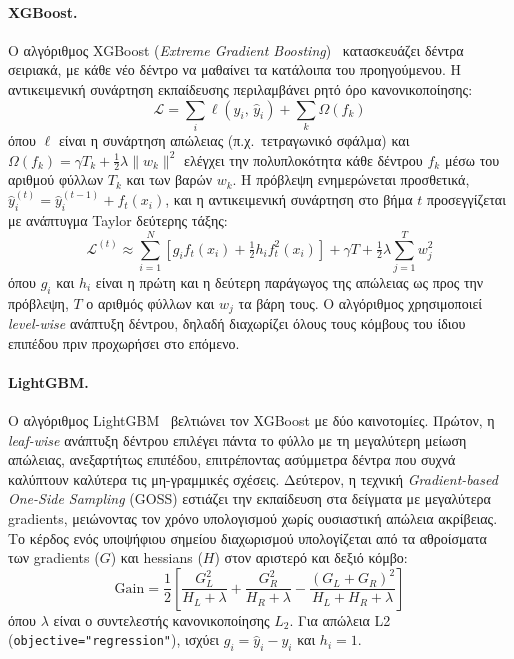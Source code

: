 \paragraph{XGBoost.}
Ο αλγόριθμος XGBoost (\textit{Extreme Gradient Boosting})~\cite{chen2016xgboost}
κατασκευάζει δέντρα σειριακά, με κάθε νέο δέντρο να
μαθαίνει τα κατάλοιπα του προηγούμενου. Η αντικειμενική
συνάρτηση εκπαίδευσης περιλαμβάνει ρητό όρο κανονικοποίησης:
%
\begin{equation}
  \mathcal{L} = \sum_{i} \ell\!\left(y_i,\,\hat{y}_i\right)
    + \sum_{k}\Omega(f_k)
  \label{eq:xgb}
\end{equation}
%
όπου $\ell$ είναι η συνάρτηση απώλειας (π.χ.\ τετραγωνικό σφάλμα)
και $\Omega(f_k) = \gamma T_k + \frac{1}{2}\lambda\|w_k\|^2$
ελέγχει την πολυπλοκότητα κάθε δέντρου $f_k$ μέσω
του αριθμού φύλλων $T_k$ και των βαρών $w_k$.
Η πρόβλεψη ενημερώνεται προσθετικά,
$\hat{y}_i^{(t)} = \hat{y}_i^{(t-1)} + f_t(x_i)$, και η αντικειμενική συνάρτηση
στο βήμα $t$ προσεγγίζεται με ανάπτυγμα Taylor δεύτερης τάξης:
%
\begin{equation}
  \mathcal{L}^{(t)} \approx \sum_{i=1}^{N}\left[g_i f_t(x_i)
     + \tfrac{1}{2}h_i f_t^2(x_i)\right]
     + \gamma T + \tfrac{1}{2}\lambda\sum_{j=1}^{T} w_j^2
  \label{eq:xgb_taylor}
\end{equation}
%
όπου $g_i$ και $h_i$ είναι η πρώτη και η δεύτερη παράγωγος της απώλειας ως προς
την πρόβλεψη, $T$ ο αριθμός φύλλων και $w_j$ τα βάρη τους.
Ο αλγόριθμος χρησιμοποιεί \emph{level-wise} ανάπτυξη
δέντρου, δηλαδή διαχωρίζει όλους τους κόμβους του
ίδιου επιπέδου πριν προχωρήσει στο επόμενο.

\paragraph{LightGBM.}
Ο αλγόριθμος LightGBM~\cite{ke2017lgbm} βελτιώνει
τον XGBoost με δύο καινοτομίες. Πρώτον, η \emph{leaf-wise}
ανάπτυξη δέντρου επιλέγει πάντα το φύλλο με τη μεγαλύτερη
μείωση απώλειας, ανεξαρτήτως επιπέδου, επιτρέποντας
ασύμμετρα δέντρα που συχνά καλύπτουν καλύτερα τις μη-γραμμικές
σχέσεις. Δεύτερον, η τεχνική \textit{Gradient-based One-Side
Sampling} (GOSS) εστιάζει την εκπαίδευση στα δείγματα
με μεγαλύτερα gradients, μειώνοντας τον χρόνο υπολογισμού
χωρίς ουσιαστική απώλεια ακρίβειας.
Το κέρδος ενός υποψήφιου σημείου διαχωρισμού υπολογίζεται από τα αθροίσματα των
gradients ($G$) και hessians ($H$) στον αριστερό και δεξιό κόμβο:
%
\begin{equation}
  \mathrm{Gain} = \frac{1}{2}\left[
    \frac{G_L^2}{H_L+\lambda} + \frac{G_R^2}{H_R+\lambda}
    - \frac{(G_L+G_R)^2}{H_L+H_R+\lambda}\right]
  \label{eq:lgbm_gain}
\end{equation}
%
όπου $\lambda$ είναι ο συντελεστής κανονικοποίησης $L_2$. Για απώλεια L2
(\texttt{objective="regression"}), ισχύει $g_i=\hat{y}_i-y_i$ και $h_i=1$.


